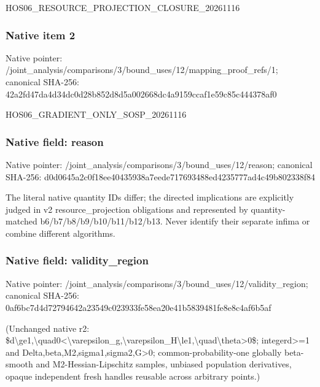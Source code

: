 \documentclass[10pt,a4paper]{article}
\begin{document}
\begingroup\raggedright\sloppy HOS06\_\allowbreak{}RESOURCE\_\allowbreak{}PROJECTION\_\allowbreak{}CLOSURE\_\allowbreak{}20261116\par\endgroup

\subsubsection{Native item 2}
Native pointer: /joint\_\allowbreak{}analysis/comparisons/3/bound\_\allowbreak{}uses/12/mapping\_\allowbreak{}proof\_\allowbreak{}refs/1; canonical SHA-256: 42a2fd47da4d34dc0d28b852d8d5a002668dc4a9159ccaf1e59c85c444378af0

\begingroup\raggedright\sloppy HOS06\_\allowbreak{}GRADIENT\_\allowbreak{}ONLY\_\allowbreak{}SOSP\_\allowbreak{}20261116\par\endgroup

\subsubsection{Native field: reason}
Native pointer: /joint\_\allowbreak{}analysis/comparisons/3/bound\_\allowbreak{}uses/12/reason; canonical SHA-256: d0d0645a2c0f18ee40435938a7eede717693488ed4235777ad4c49b802338f84

\begingroup\raggedright\sloppy The literal native quantity IDs differ;\allowbreak{} the directed implications are explicitly judged in v2 resource\_\allowbreak{}projection obligations and represented by quantity-matched b6/\allowbreak{}b7/\allowbreak{}b8/\allowbreak{}b9/\allowbreak{}b10/\allowbreak{}b11/\allowbreak{}b12/\allowbreak{}b13. Never identify their separate infima or combine different algorithms.\par\endgroup

\subsubsection{Native field: validity\_\allowbreak{}region}
Native pointer: /joint\_\allowbreak{}analysis/comparisons/3/bound\_\allowbreak{}uses/12/validity\_\allowbreak{}region; canonical SHA-256: 0af6bc7d4d72794642a23549c023933fe58ea20e41b5839481fe8e8c4af6b5af

\begingroup\raggedright\sloppy (Unchanged native r2:\allowbreak{} \$d\textbackslash{}ge1,\allowbreak{}\textbackslash{}quad0<\textbackslash{}varepsilon\_\allowbreak{}g,\allowbreak{}\textbackslash{}varepsilon\_\allowbreak{}H\textbackslash{}le1,\allowbreak{}\textbackslash{}quad\textbackslash{}theta>0\$;\allowbreak{} integerd>=\allowbreak{}1 and Delta,\allowbreak{}beta,\allowbreak{}M2,\allowbreak{}sigma1,\allowbreak{}sigma2,\allowbreak{}G>0;\allowbreak{} common-probability-one globally beta-smooth and M2-Hessian-Lipschitz samples,\allowbreak{} unbiased population derivatives,\allowbreak{} opaque independent fresh handles reusable across arbitrary points.)\par\endgroup
\end{document}
